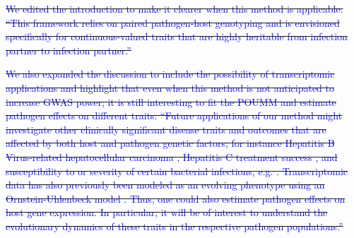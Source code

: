 \documentclass[12pt]{article} %
\providecommand{\DIFdel}[1]{{\protect\color{red}\sout{#1}}}                      %
\begin{document}
\DIFdel{\textcolor{blue}{We edited the introduction to make it clearer when this method is applicable: ``This framework relies on paired pathogen-host genotyping and is envisioned specifically for continuous-valued traits that are highly heritable from infection partner to infection partner.''}
}%

\DIFdel{\textcolor{blue}{We also expanded the discussion to include the possibility of transcriptomic applications and highlight that even when this method is not anticipated to increase GWAS power, it is still interesting to fit the POUMM and estimate pathogen effects on different traits: ``Future applications of our method might investigate other clinically significant disease traits and outcomes that are affected by both host and pathogen genetic factors, for instance Hepatitis B Virus-related hepatocellular carcinoma \citep{An2018HostCarcinoma}, Hepatitis C treatment success \citep{Ansari2017Genome-to-genomeVirus}, and susceptibility to or severity of certain bacterial infections, e.g. \cite{Messina2016ImpactInfections, Donnenberg2015BacterialStudies}. Transcriptomic data has also previously been modeled as an evolving phenotype using an Ornstein-Uhlenbeck model \citep{Rohlfs2014ModelingVariation}. Thus, one could also estimate pathogen effects on host gene expression. In particular, it will be of interest to understand the evolutionary dynamics of these traits in the respective pathogen populations.''}
}%
\end{document}
